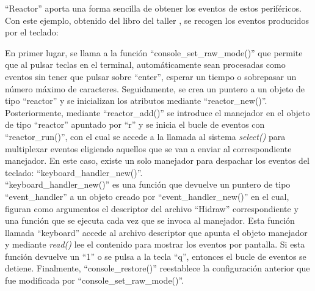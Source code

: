 ``Reactor'' aporta una forma sencilla de obtener los eventos de estos periféricos. Con este ejemplo, obtenido del libro del taller \citep[pág. 98--99]{tallerRPi}, se recogen los eventos producidos por el teclado:

\clearpage

En primer lugar, se llama a la función ``console\_set\_raw\_mode()'' que permite que al pulsar teclas en el terminal, automáticamente sean procesadas como eventos sin tener que pulsar sobre ``enter'', esperar un tiempo o sobrepasar un número máximo de caracteres. Seguidamente, se crea un puntero a un objeto de tipo ``reactor'' y se inicializan los atributos mediante ``reactor\_new()''. Posteriormente, mediante ``reactor\_add()'' se introduce el manejador en el objeto de tipo ``reactor'' apuntado por ``r'' y se inicia el bucle de eventos con ``reactor\_run()'', con el cual se accede a la llamada al sistema {\itshape select()} para multiplexar eventos eligiendo aquellos que se van a enviar al correspondiente manejador. En este caso, existe un solo manejador para despachar los eventos del teclado: ``keyboard\_handler\_new()''. \\
``keyboard\_handler\_new()'' es una función que devuelve un puntero de tipo ``event\_handler'' a un objeto creado por ``event\_handler\_new()'' en el cual, figuran como argumentos el descriptor del archivo ``Hidraw'' correspondiente y una función que se ejecuta cada vez que se invoca al manejador. Esta función llamada ``keyboard'' accede al archivo descriptor que apunta el objeto manejador y mediante {\itshape read()} lee el contenido para mostrar los eventos por pantalla. Si esta función devuelve un ``1'' o se pulsa a la tecla ``q'', entonces el bucle de eventos se detiene. Finalmente, ``console\_restore()'' reestablece la configuración anterior que fue modificada por ``console\_set\_raw\_mode()''. 



